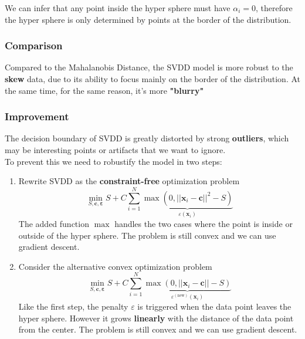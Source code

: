 \begin{observation}
	We can infer that any point inside the hyper sphere must have $\alpha_i = 0$, therefore the hyper sphere is only determined by points at the border of the distribution.
\end{observation}

\subsubsection{Comparison}
Compared to the Mahalanobis Distance, the SVDD model is more robust to the \textbf{skew} data, due to its ability to focus mainly on the border of the distribution. At the same time, for the same reason, it's more \textbf{"blurry"}

\subsubsection{Improvement}
The decision boundary of SVDD is greatly distorted by strong \textbf{outliers}, which may be interesting points or artifacts that we want to ignore. \\
To prevent this we need to robustify the model in two steps:
\begin{enumerate}
	\item Rewrite SVDD as the \textbf{constraint-free} optimization problem
	\begin{equation}
		\min_{S, \mathbf{c}, \mathbf{\varepsilon}} S + C \sum_{i=1}^N \underbrace{\max(0, \lvert\lvert \mathbf{x}_i - \mathbf{c}\rvert\rvert^2 - S)}_{\varepsilon(\mathbf{x}_i)}
	\end{equation}
	The added function $\max$ handles the two cases where the point is inside or outside of the hyper sphere. The problem is still convex and we can use gradient descent.
	\item Consider the alternative convex optimization problem
	\begin{equation}
		\min_{S, \mathbf{c}, \mathbf{\varepsilon}} S + C \sum_{i=1}^N \underbrace{\max(0, \lvert\lvert \mathbf{x}_i - \mathbf{c}\rvert\rvert - S)}_{\varepsilon^{(\text{new})}(\mathbf{x}_i)}
	\end{equation}
	Like the first step, the penalty $\varepsilon$ is triggered when the data point leaves the hyper sphere. However it grows \textbf{linearly} with the distance of the data point from the center. The problem is still convex and we can use gradient descent.
\end{enumerate}